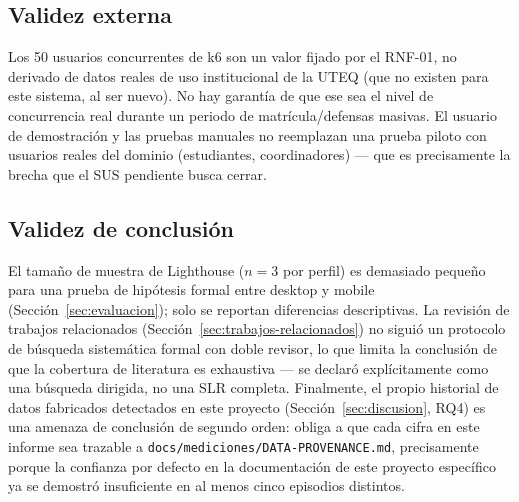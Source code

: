 \subsection{Validez externa}
Los 50 usuarios concurrentes de k6 son un valor fijado por el RNF-01, no derivado de datos reales de uso
institucional de la UTEQ (que no existen para este sistema, al ser nuevo). No hay garantía de que ese
sea el nivel de concurrencia real durante un periodo de matrícula/defensas masivas. El usuario de
demostración y las pruebas manuales no reemplazan una prueba piloto con usuarios reales del dominio
(estudiantes, coordinadores) --- que es precisamente la brecha que el SUS pendiente busca cerrar.

\subsection{Validez de conclusión}
El tamaño de muestra de Lighthouse ($n=3$ por perfil) es demasiado pequeño para una prueba de hipótesis
formal entre desktop y mobile (Sección~\ref{sec:evaluacion}); solo se reportan diferencias descriptivas.
La revisión de trabajos relacionados (Sección~\ref{sec:trabajos-relacionados}) no siguió un protocolo de
búsqueda sistemática formal con doble revisor, lo que limita la conclusión de que la cobertura de
literatura es exhaustiva --- se declaró explícitamente como una búsqueda dirigida, no una SLR completa.
Finalmente, el propio historial de datos fabricados detectados en este proyecto (Sección~\ref{sec:discusion},
RQ4) es una amenaza de conclusión de segundo orden: obliga a que cada cifra en este informe sea trazable
a \texttt{docs/mediciones/DATA-PROVENANCE.md}, precisamente porque la confianza por defecto en la
documentación de este proyecto específico ya se demostró insuficiente en al menos cinco episodios
distintos.
\newpage
